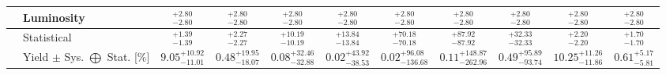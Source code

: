 \begin{tabular}{|cl||ccccccc|c||c|}
\hline
&Luminosity &  $^{+2.80}_{-2.80}$  &  $^{+2.80}_{-2.80}$  &  $^{+2.80}_{-2.80}$  &  $^{+2.80}_{-2.80}$  &  $^{+2.80}_{-2.80}$  &  $^{+2.80}_{-2.80}$  &  $^{+2.80}_{-2.80}$  &  $^{+2.80}_{-2.80}$  &  $^{+2.80}_{-2.80}$ \\ 
\hline
&Statistical &  $^{+1.39}_{-1.39}$  &  $^{+2.27}_{-2.27}$  &  $^{+10.19}_{-10.19}$  &  $^{+13.84}_{-13.84}$  &  $^{+70.18}_{-70.18}$  &  $^{+87.92}_{-87.92}$  &  $^{+32.33}_{-32.33}$  &  $^{+2.20}_{-2.20}$  &  $^{+1.70}_{-1.70}$ \\ 
\hline
\hline
&Yield $\pm$ Sys. $\bigoplus$ Stat. [\%] &  $9.05^{+10.92}_{-11.01}$  &  $0.48^{+19.95}_{-18.07}$  &  $0.08^{+32.46}_{-32.88}$  &  $0.02^{+43.92}_{-38.53}$  &  $0.02^{+96.08}_{-136.68}$  &  $0.11^{+148.87}_{-262.96}$  &  $0.49^{+95.89}_{-93.74}$  &  $10.25^{+11.26}_{-11.86}$  &  $0.61^{+5.17}_{-5.81}$ \\ 
\hline
\end{tabular}
